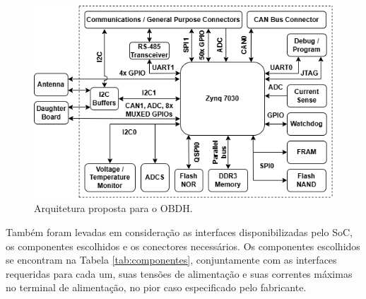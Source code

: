 \begin{figure}[H]
    \centering
    \includegraphics[scale=0.8]{images/arquitetura final.png}
    \caption{Arquitetura proposta para o OBDH.}
    \label{fig:arq}
\end{figure}

Também foram levadas em consideração as interfaces disponibilizadas pelo SoC, os componentes escolhidos e os conectores necessários. Os componentes escolhidos se encontram na Tabela \ref{tab:componentes}, conjuntamente com as interfaces requeridas para cada um, suas tensões de alimentação e suas correntes máximas no terminal de alimentação, no pior caso especificado pelo fabricante.

